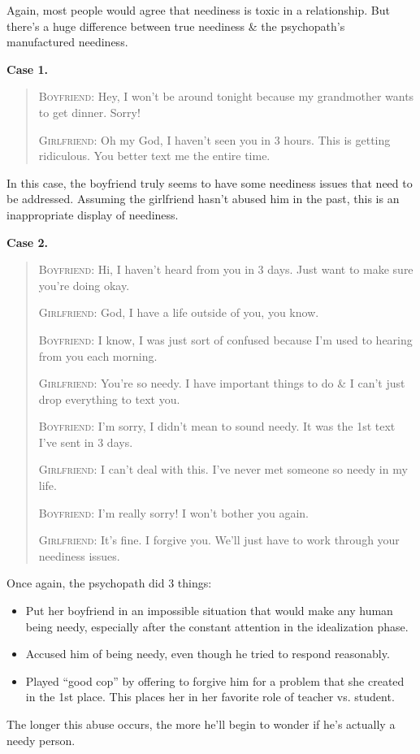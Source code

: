 \documentclass{article}
\numberwithin{equation}{section}
\begin{document}
Again, most people would agree that neediness is toxic in a relationship. But there's a huge difference between true neediness \& the psychopath's manufactured neediness.

\textbf{Case 1.}
\begin{quotation}
	\textsc{Boyfriend}: Hey, I won't be around tonight because my grandmother wants to get dinner. Sorry!
	
	\textsc{Girlfriend}: Oh my God, I haven't seen you in 3 hours. This is getting ridiculous. You better text me the entire time.
\end{quotation}
In this case, the boyfriend truly seems to have some neediness issues that need to be addressed. Assuming the girlfriend hasn't abused him in the past, this is an inappropriate display of neediness.

\textbf{Case 2.}
\begin{quotation}
	\textsc{Boyfriend}: Hi, I haven't heard from you in 3 days. Just want to make sure you're doing okay.
	
	\textsc{Girlfriend}: God, I have a life outside of you, you know.
	
	\textsc{Boyfriend}: I know, I was just sort of confused because I'm used to hearing from you each morning.
	
	\textsc{Girlfriend}: You're so needy. I have important things to do \& I can't just drop everything to text you.
	
	\textsc{Boyfriend}: I'm sorry, I didn't mean to sound needy. It was the 1st text I've sent in 3 days.
	
	\textsc{Girlfriend}: I can't deal with this. I've never met someone so needy in my life.
	
	\textsc{Boyfriend}: I'm really sorry! I won't bother you again.
	
	\textsc{Girlfriend}: It's fine. I forgive you. We'll just have to work through your neediness issues.
\end{quotation}
Once again, the psychopath did 3 things:
\begin{itemize}
	\item Put her boyfriend in an impossible situation that would make any human being needy, especially after the constant attention in the idealization phase.
	\item Accused him of being needy, even though he tried to respond reasonably.
	\item Played ``good cop'' by offering to forgive him for a problem that she created in the 1st place. This places her in her favorite role of teacher vs. student.
\end{itemize}
The longer this abuse occurs, the more he'll begin to wonder if he's actually a needy person.
\end{document}
